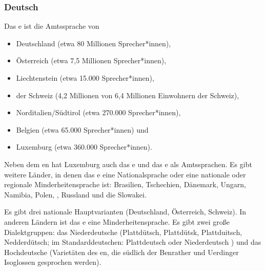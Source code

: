 \subsubsection{Deutsch}

Das e ist die Amtssprache von
\begin{itemize}
\item Deutschland (etwa 80 Millionen Sprecher*innen),
\item Österreich (etwa 7,5 Millionen Sprecher*innen),
\item Liechtenstein (etwa 15.000 Sprecher*innen),
\item der Schweiz (4,2 Millionen von 6,4 Millionen Einwohnern der Schweiz),
\item Norditalien/Südtirol (etwa 270.000 Sprecher*innen),
\item Belgien (etwa 65.000 Sprecher*innen) und
\item Luxemburg (etwa 360.000 Sprecher*innen).
\end{itemize}
Neben dem en hat Luxemburg auch das e und das e als
Amtssprachen.
Es gibt weitere Länder, in denen das e eine Nationalsprache oder eine nationale oder regionale
Minderheitensprache ist: Brasilien, Tschechien, Dänemark, Ungarn, Namibia, Polen, , Russland und die Slowakei.


Es gibt drei nationale Hauptvarianten (Deutschland, Österreich, Schweiz). In anderen Ländern ist das e
eine Minderheitensprache. Es gibt zwei große Dialektgruppen: das Niederdeutsche
(Plattdütsch, Plattdütsk, Plattduitsch, 
Nedderdütsch; im Standarddeutschen: Platt\-deutsch oder Nie\-der\-deutsch%
) und das Hochdeutsche (Varietäten des en, die südlich der Benrather und Uerdinger
Isoglossen gesprochen werden).

